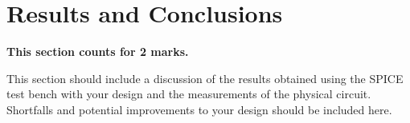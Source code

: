 \documentclass{article}
\begin{document}
\section{Results and Conclusions}
\textbf{This section counts for 2 marks.}

This section should include a discussion of the results obtained using the SPICE test bench with your design and the measurements of the physical circuit. Shortfalls and potential improvements to your design should be included here.
\end{document}
